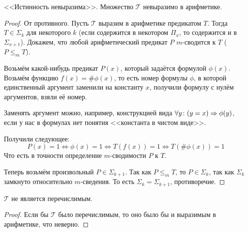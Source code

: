 \begin{theorem}[Тарского]
	<<Истинность невыразима>>.
	Множество $\mathcal{T}$ невыразимо в арифметике.
\end{theorem}
\begin{proof}
	От противного.
	Пусть $\mathcal{T}$ выразим в арифметике предикатом $T$.
	Тогда $T \in \Sigma_k$ для некоторого $k$ (если содержится в некотором $\Pi_{x}$, то содержится и в $\Sigma_{x+1}$).
	Докажем, что любой арифметический предикат $P$ $m$-сводится к $T$ ($P \le_m T$).

	Возьмём какой-нибудь предикат $P(x)$, который задаётся формулой $\phi(x)$.
	Возьмём функцию $f(x) = \# \phi(x)$, то есть номер формулы $\phi$, в которой единственный аргумент заменили
	на константу $x$, получили формулу с нулём аргументов, взяли её номер.
	\begin{Rem}
	Заменять аргумент можно, например, конструкцией вида $\forall y \colon (y=x) \Rightarrow \phi(y)$, если
	у нас в формулах нет понятия <<константа в чистом виде>>.
	\end{Rem}
	Получили следующее:
	\[ P(x) = 1 \iff \phi(x) = 1 \iff T(f(x)) = 1 \iff T(\# \phi(x)) = 1 \]
	Что есть в точности определение $m$-сводимости $P$ к $T$.
	
	Теперь возьмём произвольный $P \in \Sigma_{k+1}$.
	Так как $P \le_m T$, то $P \in \Sigma_k$, так как $\Sigma_k$ замкнуто относительно $m$-сведения.
	То есть $\Sigma_k = \Sigma_{k+1}$, противоречие.
\end{proof}

\begin{conseq}
	$\mathcal{T}$ не является перечислимым.
\end{conseq}
\begin{proof}
	Если бы $\mathcal{T}$ было перечислимым, то оно было бы и выразимым в арифметике, что неверно.
\end{proof}


